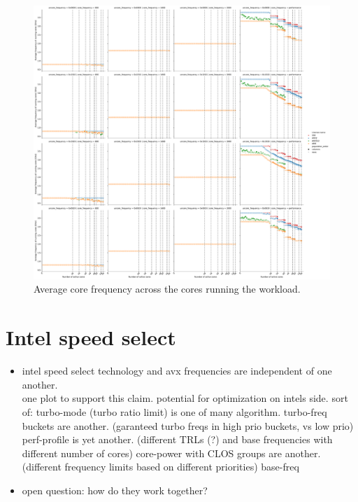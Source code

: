 \begin{figure}[]
    \centering
    \includegraphics[width=\columnwidth]{fig/core-power-regulators-core-frequency.pdf}
    \caption{\label{fig:avx-anomaly-core-frequency}Average core frequency across the cores running the workload.}
\end{figure}



\section{Intel speed select}
\label{sec:isst}

\begin{itemize}
    \item intel speed select technology and avx frequencies are independent of one another.\\
    one plot to support this claim. potential for optimization on intels side.
    sort of: turbo-mode (turbo ratio limit) is one of many algorithm.
    turbo-freq buckets are another. (garanteed turbo freqs in high prio buckets, vs low prio)
    perf-profile is yet another. (different TRLs (?) and base frequencies with different number of cores)
    core-power with CLOS groups are another. (different frequency limits based on different priorities)
    base-freq
    \item open question: how do they work together?
\end{itemize}

